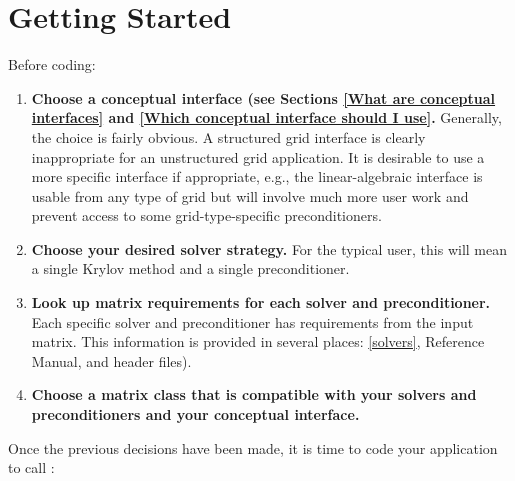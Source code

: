

\chapter{Getting Started}
\label{Getting Started}

Before coding:

\begin{enumerate}

\item
{\bf Choose a conceptual interface (see Sections
\ref{What are conceptual interfaces} and
\ref{Which conceptual interface should I use}.}
Generally, the choice is fairly obvious.  A structured grid interface
is clearly inappropriate for an unstructured grid application.  It is
desirable to use a more specific interface if appropriate, e.g., the
linear-algebraic interface is usable from any type of grid but will
involve much more user work and prevent access to some
grid-type-specific preconditioners.

\item 
{\bf Choose your desired solver strategy. } For the typical user, this
will mean a single Krylov method and a single preconditioner.

\item 
{\bf Look up matrix requirements for each solver and preconditioner.}
Each specific solver and preconditioner has requirements from the
input matrix. This information is provided in several places:
\ref{solvers}, \hypre{} Reference Manual, and header files).

\item 
{\bf Choose a matrix class that is compatible with your solvers and
preconditioners and your conceptual interface.}

\end{enumerate}
Once the previous decisions have been made, it is time to code your
application to call \hypre{}:
